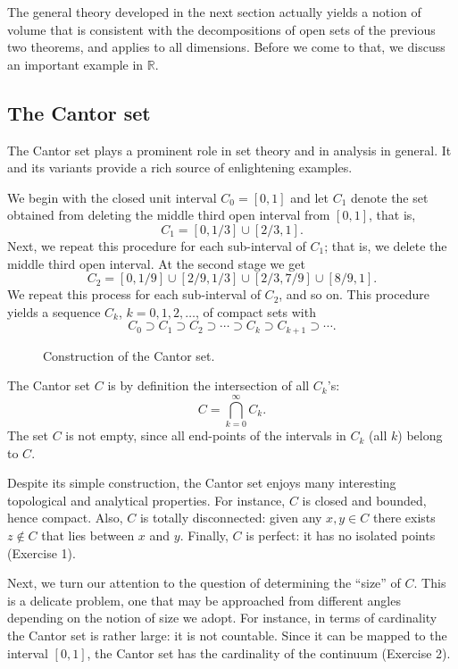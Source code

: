 \documentclass[11pt,openany]{book}
\begin{document}
The general theory developed in the next section actually yields a notion of volume that is consistent with the decompositions of open sets of the previous two theorems, and applies to all dimensions. Before we come to that, we discuss an important example in $\mathbb{R}$.

\subsection*{The Cantor set}

The Cantor set plays a prominent role in set theory and in analysis in general. It and its variants provide a rich source of enlightening examples.

We begin with the closed unit interval $C_0=[0,1]$ and let $C_1$ denote the set obtained from deleting the middle third open interval from $[0,1]$, that is,
\[
 C_1=[0,1/3]\cup[2/3,1].
\]
Next, we repeat this procedure for each sub-interval of $C_1$; that is, we delete the middle third open interval. At the second stage we get
\[
 C_2=[0,1/9]\cup[2/9,1/3]\cup[2/3,7/9]\cup[8/9,1].
\]
We repeat this process for each sub-interval of $C_2$, and so on. This procedure yields a sequence $C_k$, $k=0,1,2,\ldots$, of compact sets with
\[
 C_0\supset C_1\supset C_2\supset\cdots\supset C_k\supset C_{k+1}\supset\cdots.
\]

\begin{figure}[ht]
\centering
{}
\caption{Construction of the Cantor set.}
\end{figure}

The Cantor set $C$ is by definition the intersection of all $C_k$'s:
\[
 C=\bigcap_{k=0}^{\infty}C_k.
\]
The set $C$ is not empty, since all end-points of the intervals in $C_k$ (all $k$) belong to $C$.

Despite its simple construction, the Cantor set enjoys many interesting topological and analytical properties. For instance, $C$ is closed and bounded, hence compact. Also, $C$ is totally disconnected: given any $x,y\in C$ there exists $z\notin C$ that lies between $x$ and $y$. Finally, $C$ is perfect: it has no isolated points (Exercise 1).

Next, we turn our attention to the question of determining the ``size'' of $C$. This is a delicate problem, one that may be approached from different angles depending on the notion of size we adopt. For instance, in terms of cardinality the Cantor set is rather large: it is not countable. Since it can be mapped to the interval $[0,1]$, the Cantor set has the cardinality of the continuum (Exercise 2).
\end{document}
